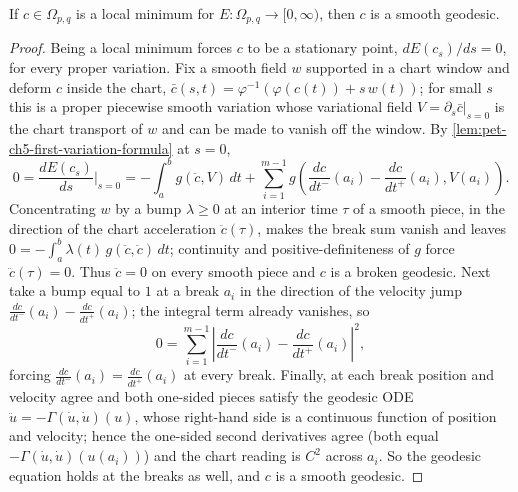 \begin{theorem}
  \label{thm:pet-ch5-energy-minima-geodesics}
  \leanok
  If $c\in\Omega_{p,q}$ is a local minimum for $E:\Omega_{p,q}\to[0,\infty)$, then
  $c$ is a smooth geodesic.
\end{theorem}
\begin{proof}
  \leanok
  Being a local minimum forces $c$ to be a stationary point, $dE(c_s)/ds=0$, for
  every proper variation. Fix a smooth field $w$ supported in a chart window and
  deform $c$ inside the chart, $\bar c(s,t)=\varphi^{-1}(\varphi(c(t))+s\,w(t))$; for
  small $s$ this is a proper piecewise smooth variation whose variational field
  $V=\partial_s\bar c|_{s=0}$ is the chart transport of $w$ and can be made to vanish
  off the window. By \cref{lem:pet-ch5-first-variation-formula} at $s=0$,
  \[
    0=\frac{dE(c_s)}{ds}\Big|_{s=0}
    =-\int_a^bg(\ddot c,V)\,dt+\sum_{i=1}^{m-1}g\!\left(\frac{dc}{dt^-}(a_i)-\frac{dc}{dt^+}(a_i),V(a_i)\right).
  \]
  Concentrating $w$ by a bump $\lambda\ge 0$ at an interior time $\tau$ of a smooth
  piece, in the direction of the chart acceleration $\ddot c(\tau)$, makes the break
  sum vanish and leaves $0=-\int_a^b\lambda(t)\,g(\ddot c,\ddot c)\,dt$; continuity and
  positive-definiteness of $g$ force $\ddot c(\tau)=0$. Thus $\ddot c=0$ on every
  smooth piece and $c$ is a broken geodesic. Next take a bump equal to $1$ at a break
  $a_i$ in the direction of the velocity jump $\frac{dc}{dt^-}(a_i)-\frac{dc}{dt^+}(a_i)$;
  the integral term already vanishes, so
  \[
    0=\sum_{i=1}^{m-1}\left|\frac{dc}{dt^-}(a_i)-\frac{dc}{dt^+}(a_i)\right|^2,
  \]
  forcing $\frac{dc}{dt^-}(a_i)=\frac{dc}{dt^+}(a_i)$ at every break. Finally, at each
  break position and velocity agree and both one-sided pieces satisfy the geodesic ODE
  $\ddot u=-\Gamma(\dot u,\dot u)(u)$, whose right-hand side is a continuous function of
  position and velocity; hence the one-sided second derivatives agree (both equal
  $-\Gamma(\dot u,\dot u)(u(a_i))$) and the chart reading is $C^2$ across $a_i$. So the
  geodesic equation holds at the breaks as well, and $c$ is a smooth geodesic.
\end{proof}

